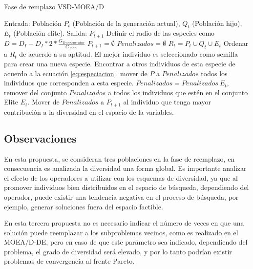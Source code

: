 \begin{algorithm}[H]
  \scriptsize
	\caption{Fase de remplazo VSD-MOEA/D} 
	\begin{algorithmic}[1]
	\STATE Entrada: Población $P_t$ (Población de la generación actual), $Q_t$ (Población hijo), $E_t$ (Población elite).
	\STATE Salida: $P_{t+1}$
	\STATE Definir el radio de las especies como $D = D_I - D_I *2* \frac{G_{Transcurridas}}{G_{Final}}$ \label{alg:especies_radio}
	\STATE $P_{t+1} = \emptyset$
	\STATE $Penalizados = \emptyset$
	\STATE $R_t = P_t \cup Q_t \cup E_t$ \label{alg:union_MOEAD}
	\STATE Ordenar a $R_t$ de acuerdo a su aptitud. \label{alg:ordenacion_moead} 
	 \label{alg:especiacion_ciclo_ini}
	   \STATE El mejor individuo es seleccionado como semilla para crear una nueva especie.
	   \STATE Encontrar a otros individuos de esta especie de acuerdo a la ecuación \ref{eq:especiacion}.
	   \STATE mover de $P$ a $Penalizados$ todos los individuos que corresponden a esta especie.
	\ENDWHILE \label{alg:especiacion_ciclo_fin} 
	\STATE $Penalizados = Penalizados \ E_t $, remover del conjunto $Penalizados$ a todos los individuos que estén en el conjunto Elite $E_t$.
	   \STATE   Mover de $Penalizados$ a $P_{t+1}$ al individuo que tenga mayor contribución a la diversidad en el espacio de la variables.
	\ENDWHILE
    \label{alg:Fase_Remplazo_VSD-MOEAD}
\end{algorithmic}
\end{algorithm}

\subsection{Observaciones}

En esta propuesta, se consideran tres poblaciones en la fase de reemplazo, en consecuencia es analizada la diversidad una forma global.
%
Es importante analizar el efecto de los operadores a utilizar con los esquemas de diversidad, ya que al promover individuos bien distribuidos en el espacio de búsqueda, dependiendo del operador, puede existir una tendencia negativa en el proceso de búsqueda, por ejemplo, generar soluciones fuera del espacio factible.
%

En esta tercera propuesta no es necesario indicar el número de veces en que una solución puede reemplazar a los subproblemas vecinos, como es realizado en el MOEA/D-DE, pero en caso de que este parámetro sea indicado, dependiendo del problema, el grado de diversidad será elevado, y por lo tanto podrían existir problemas de convergencia al frente Pareto.
%

